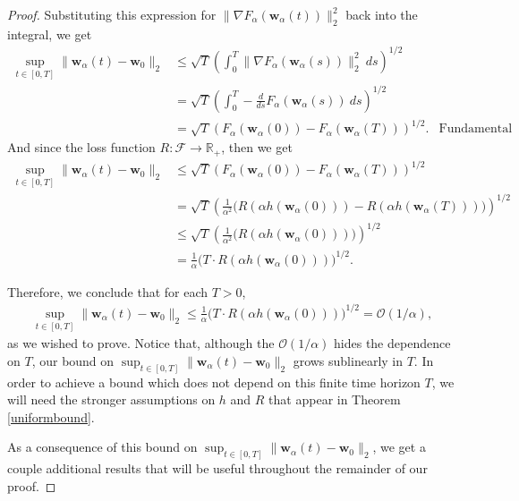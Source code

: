 \documentclass{article}
\begin{document}
\begin{proof}
Substituting this expression for $\| \nabla F_{\alpha}(\boldsymbol{w}_{\alpha}(t))\|_2^2$ back into the integral, we get
\begin{align*}
    \sup_{t \in [0, T]} \|\boldsymbol{w}_{\alpha}(t) - \boldsymbol{w}_0 \|_2 &\leq \sqrt{T} \left( \int_0^T \| \nabla F_{\alpha}(\boldsymbol{w}_{\alpha}(s)) \|_2^2 \ ds \right)^{1/2}\\
    &= \sqrt{T} \left( \int_0^T -\frac{d}{ds}F_{\alpha}(\boldsymbol{w}_{\alpha}(s)) \ ds \right)^{1/2}\\
    &= \sqrt{T} \left(  F_{\alpha}(\boldsymbol{w}_{\alpha}(0)) - F_{\alpha}(\boldsymbol{w}_{\alpha}(T)) \right)^{1/2}. & \text{Fundamental Theorem of Calculus}
\end{align*}
And since the loss function $R: \mathcal{F} \rightarrow \mathbb{R}_+$, then we get
\begin{align*}
    \sup_{t \in [0, T]} \|\boldsymbol{w}_{\alpha}(t) - \boldsymbol{w}_0 \|_2 &\leq \sqrt{T} \left(  F_{\alpha}(\boldsymbol{w}_{\alpha}(0)) - F_{\alpha}(\boldsymbol{w}_{\alpha}(T)) \right)^{1/2}\\
    &= \sqrt{T} \left( \frac{1}{\alpha^2} \bigg( R(\alpha h(\boldsymbol{w}_{\alpha}(0))) - R(\alpha h(\boldsymbol{w}_{\alpha}(T))) \bigg) \right)^{1/2}\\
    &\leq \sqrt{T} \left( \frac{1}{\alpha^2} \bigg( R(\alpha h(\boldsymbol{w}_{\alpha}(0))) \bigg) \right)^{1/2}\\
    &= \frac{1}{\alpha} \bigg(T \cdot R(\alpha h(\boldsymbol{w}_{\alpha}(0))) \bigg)^{1/2}.
\end{align*}

Therefore, we conclude that for each $T > 0$,
\begin{align*}
    \sup_{t \in [0, T]} \|\boldsymbol{w}_{\alpha}(t) - \boldsymbol{w}_0 \|_2 \leq \frac{1}{\alpha} \bigg(T \cdot R(\alpha h(\boldsymbol{w}_{\alpha}(0))) \bigg)^{1/2} = \mathcal{O}(1/\alpha),
\end{align*}
as we wished to prove. Notice that, although the $\mathcal{O}(1/\alpha)$ hides the dependence on $T$, our bound on $\sup_{t \in [0, T]} \|\boldsymbol{w}_{\alpha}(t) - \boldsymbol{w}_0 \|_2$ grows sublinearly in $T$. In order to achieve a bound which does not depend on this finite time horizon $T$, we will need the stronger assumptions on $h$ and $R$ that appear in Theorem \ref{uniformbound}.

As a consequence of this bound on $ \sup_{t \in [0, T]} \|\boldsymbol{w}_{\alpha}(t) - \boldsymbol{w}_0 \|_2$, we get a couple additional results that will be useful throughout the remainder of our proof.


\end{proof}
\end{document}

